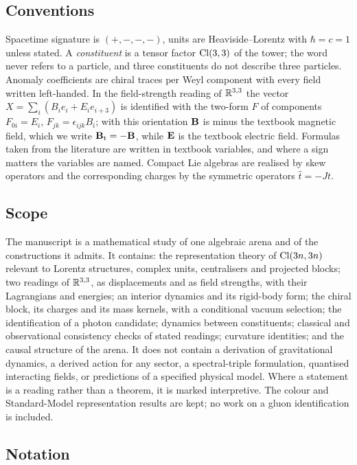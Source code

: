 \subsection{Conventions}
\label{sec:conventions}

Spacetime signature is $(+,-,-,-)$, units are Heaviside--Lorentz with $\hbar=c=1$ unless stated. A \emph{constituent} is
a tensor factor $\mathrm{Cl}(3,3)$ of the tower; the word never refers to a particle, and three constituents do not describe three
particles. Anomaly coefficients are chiral traces per Weyl component with every field written left-handed. In the
field-strength reading of $\mathbb{R}^{3,3}$ the vector $X=\sum_i(B_ie_i+E_ie_{i+3})$ is identified with the two-form $F$ of
components $F_{0i}=E_i$, $F_{jk}=\epsilon_{ijk}B_i$; with this orientation $\mathbf B$ is minus the textbook magnetic field,
which we write $\mathbf B_{\rm t}=-\mathbf B$, while $\mathbf E$ is the textbook electric field. Formulas taken from the literature are written in
textbook variables, and where a sign matters the variables are named. Compact Lie algebras are realised by skew operators
and the corresponding charges by the symmetric operators $\hat t=-Jt$.

\subsection{Scope}
\label{sec:fm:scope}

The manuscript is a mathematical study of one algebraic arena and of the constructions it admits. It contains:
the representation theory of $\mathrm{Cl}(3n,3n)$ relevant to Lorentz structures, complex units, centralisers and projected blocks; two readings of
$\mathbb{R}^{3,3}$, as displacements and as field strengths, with their Lagrangians and energies; an interior dynamics and its rigid-body form; the
chiral block, its charges and its mass kernels, with a conditional vacuum selection; the identification of a photon candidate; dynamics
between constituents; classical and observational consistency checks of stated readings; curvature identities; and the causal structure of
the arena. It does not contain a derivation of gravitational dynamics, a derived action for any sector, a spectral-triple formulation,
quantised interacting fields, or predictions of a specified physical model. Where a statement is a reading rather than a theorem, it is
marked interpretive. The colour and Standard-Model representation results are kept; no work on a gluon identification is included.

\subsection{Notation}
\label{sec:fm:notation}

